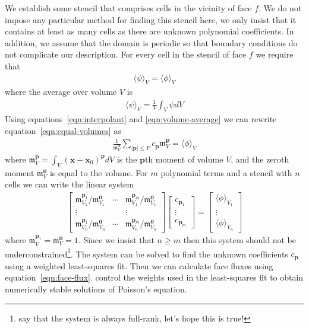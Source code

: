 \documentclass{article}
\newcommand{\Mag}[1]{\lvert #1 \rvert}
\newcommand{\vect}{\mathbf}
\newcommand{\moment}{\mathfrak{m}}
\begin{document}
We establish some stencil that comprises cells in the vicinity of face $f$.  We do not impose any particular method for finding this stencil here, we only insist that it contains at least as many cells as there are unknown polynomial coefficients.  In addition, we assume that the domain is periodic so that boundary conditions do not complicate our description.  For every cell in the stencil of face $f$ we require that
\begin{align}
	\langle \psi \rangle_V = \langle \phi \rangle_V \label{eqn:equal-volumes}
\end{align}
where the average over volume $V$ is
\begin{align}
	\langle \psi \rangle_V = \frac{1}{V} \int_V \psi dV \label{eqn:volume-average}
\end{align}
Using equations~\eqref{eqn:interpolant} and \eqref{eqn:volume-average} we can rewrite equation~\eqref{eqn:equal-volumes} as
\begin{align}
	\frac{1}{\moment_V^\vect{0}} \sum_{\Mag{\vect{p}} \leq P} c_\vect{p} \moment_V^\vect{p} = \langle \phi \rangle_V
\end{align}
where $\moment_V^\vect{p} = \int_V \left( \vect{x} - \vect{x}_0 \right)^\vect{p} dV$ is the $\vect{p}$th moment of volume $V$, and the zeroth moment $\moment_V^\vect{0}$ is equal to the volume.
For $m$ polynomial terms and a stencil with $n$ cells we can write the linear system
\begin{align}
	\begin{bmatrix}
		\moment_{V_1}^{\vect{p}_1}/\moment_{V_1}^\vect{0} & \cdots & \moment_{V_1}^{\vect{p}_m}/\moment_{V_1}^\vect{0} \\
		\vdots & & \vdots \\
		\moment_{V_n}^{\vect{p}_1}/\moment_{V_n}^\vect{0} & \cdots & \moment_{V_n}^{\vect{p}_m}/\moment_{V_n}^\vect{0}
	\end{bmatrix}
	\begin{bmatrix}
		c_{\vect{p}_1} \\
		\vdots \\
		c_{\vect{p}_m}
	\end{bmatrix}
	=
	\begin{bmatrix}
		\langle \phi \rangle_{V_1} \\
		\vdots \\
		\langle \phi \rangle_{V_n}
	\end{bmatrix}
\end{align}
where $\moment_V^{\vect{p}_1} = \moment_V^{\vect{0}} = 1$.
Since we insist that $n \geq m$ then this system should not be underconstrained\footnote{\citet{devendran2014} say that the system is always full-rank, let's hope this is true!}.  The system can be solved to find the unknown coefficients $c_\vect{p}$ using a weighted least-squares fit.  Then we can calculate face fluxes using equation~\eqref{eqn:face-flux}.  \citet{devendran2014} control the weights used in the least-squares fit to obtain numerically stable solutions of Poisson's equation.



\end{document}
